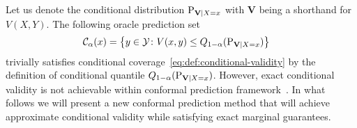   Let us denote the conditional distribution \(\textup{P}_{\mathbf{V}|X=x}\) with $\mathbf{V}$ being a shorthand for $V(X, Y)$. The following oracle prediction set
  \begin{align}
    &\mathcal{C}_{\alpha}(x) = \bigl\{y \in \mathcal{Y}\colon V(x, y) \leq Q_{1-\alpha}(\textup{P}_{\mathbf{V}|X=x})\bigr\}
  \label{eq:oracle_cc}
  \end{align}
  trivially satisfies conditional coverage~\eqref{eq:def:conditional-validity} by the definition of conditional quantile \(Q_{1-\alpha}(\textup{P}_{\mathbf{V}|X=x})\). However, exact conditional validity is not achievable within conformal prediction framework~\cite{foygel2021limits}. In what follows we will present a new conformal prediction method that will achieve approximate conditional validity while satisfying exact marginal guarantees. 
